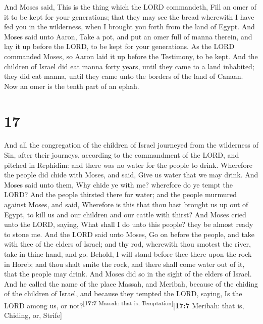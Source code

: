  And Moses said, This is the thing which the LORD
commandeth, Fill an omer of it to be kept for your generations; that
they may see the bread wherewith I have fed you in the wilderness, when
I brought you forth from the land of Egypt.  And Moses
said unto Aaron, Take a pot, and put an omer full of manna therein, and
lay it up before the LORD, to be kept for your generations.
 As the LORD commanded Moses, so Aaron laid it up before
the Testimony, to be kept.  And the children of Israel
did eat manna forty years, until they came to a land inhabited; they did
eat manna, until they came unto the borders of the land of Canaan.
 Now an omer is the tenth part of an ephah.

\hypertarget{section-16}{%
\section{17}\label{section-16}}

 And all the congregation of the children of Israel
journeyed from the wilderness of Sin, after their journeys, according to
the commandment of the LORD, and pitched in Rephidim: and there was no
water for the people to drink.  Wherefore the people did
chide with Moses, and said, Give us water that we may drink. And Moses
said unto them, Why chide ye with me? wherefore do ye tempt the LORD?
 And the people thirsted there for water; and the people
murmured against Moses, and said, Wherefore is this that thou hast
brought us up out of Egypt, to kill us and our children and our cattle
with thirst?  And Moses cried unto the LORD, saying, What
shall I do unto this people? they be almost ready to stone me.
 And the LORD said unto Moses, Go on before the people,
and take with thee of the elders of Israel; and thy rod, wherewith thou
smotest the river, take in thine hand, and go.  Behold, I
will stand before thee there upon the rock in Horeb; and thou shalt
smite the rock, and there shall come water out of it, that the people
may drink. And Moses did so in the sight of the elders of Israel.
 And he called the name of the place Massah, and Meribah,
because of the chiding of the children of Israel, and because they
tempted the LORD, saying, Is the LORD among us, or
not?\textsuperscript{{[}\textbf{17:7} Massah: that is,
Temptation{]}}{[}\textbf{17:7} Meribah: that is, Chiding, or, Strife{]}

